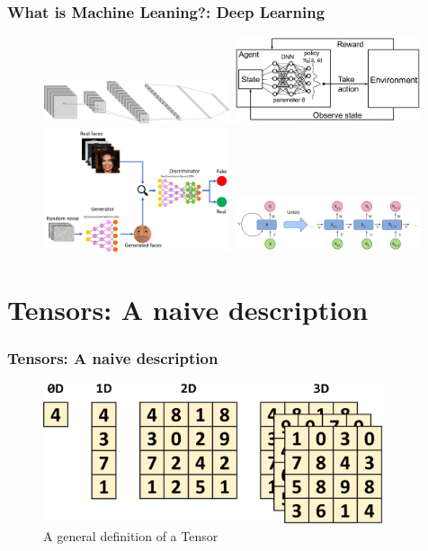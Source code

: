 \documentclass[11pt]{beamer}
\begin{document}
\begin{frame}
	\frametitle{What is Machine Leaning?: Deep Learning}
\begin{figure}
	\includegraphics[width=55mm,scale=0.5]{cnn}\hspace{2mm}
	\includegraphics[width=55mm,scale=0.5]{drl}
	\\[\smallskipamount]
	\includegraphics[width=55mm,scale=0.5]{gan}\hspace{2mm}
	\includegraphics[width=55mm,scale=0.5]{rnn}
\end{figure}
\end{frame}

\section{Tensors: A naive description}
\begin{frame}
	\frametitle{Tensors: A naive description}
		\begin{figure}
		\includegraphics[width=100mm,scale=0.7]{tensors}
		\caption{A general definition of a Tensor}
	\end{figure}
\end{frame}
\end{document}
